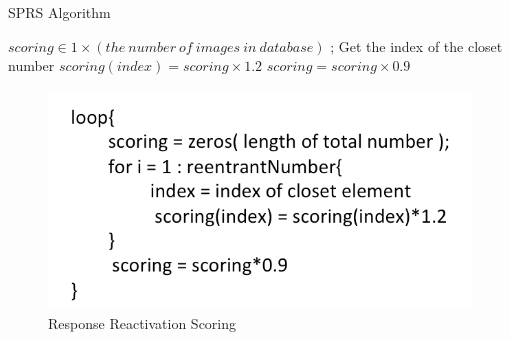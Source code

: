 \documentclass[letterpaper]{article}
\begin{document}
\begin{algorithm}[h]
  \caption{SPRS Algorithm}
  \begin{algorithmic}[2]  	
       
    	 $ scoring \in 1 \times (the\ number\ of\ images\ in\ database)$ ;
    	 	\State Get the index of the closet number
    	 	\State $scoring(index)=scoring \times 1.2$
         \EndFor
         \State $scoring = scoring \times 0.9$
         
    \EndFor 

  \end{algorithmic}
\end{algorithm}
\begin{figure}[!ht]
		\centering
		\includegraphics[width=.4\textwidth]{figures_dir/temp_algorithm2.png}
		\caption{Response Reactivation Scoring}
		\label{cottage_garden_top10_comparison}
\end{figure}
\end{document}
